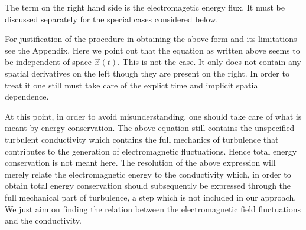 \documentclass[ ]{copernicus2}
\begin{document}
{The term on the right hand side is the electromagetic energy flux. It must be discussed separately for the special cases considered below. 

{For justification of the procedure in obtaining the above form and its limitations see the Appendix. Here we point out that the equation as written above seems to be independent of space $\vec{x}(t)$. This is not the case. It only does not contain any spatial derivatives on the left though they are present on the right. In order to treat it one still must take care of the explict time and implicit spatial dependence.}

{At this point, in order to avoid misunderstanding, one should take care of what is meant by energy conservation. The above equation still contains the unspecified turbulent conductivity which contains the full mechanics of turbulence that contributes to the generation of electromagnetic fluctuations. Hence total energy conservation is not meant here. The resolution of the above expression will merely relate the electromagnetic energy to the conductivity which, in order to obtain total energy conservation should subsequently be expressed through the full mechanical part of turbulence, a step which is not included in our approach. We just aim on finding the relation between the electromagnetic field fluctuations and the conductivity.}

}
\end{document}
